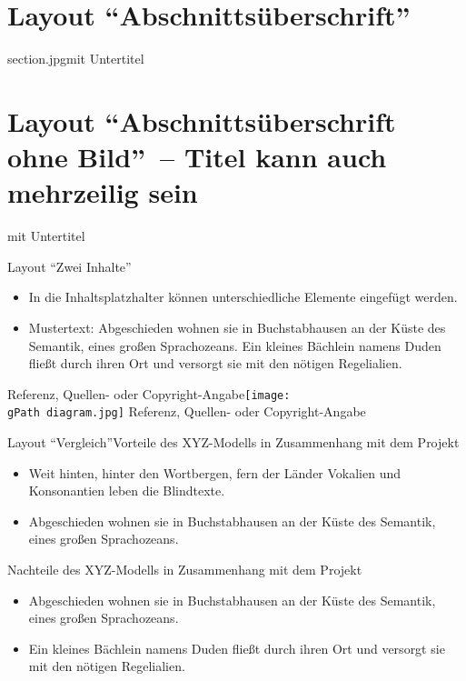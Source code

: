 \documentclass[hyperref={pdfpagelabels=false}, aspectratio=43, t]{beamer}  %
\newcommand{\gPath}{figures/}									%
\begin{document}

\section{Layout ``Abschnittsüberschrift''}

\begin{sectionFrame}{section.jpg}{mit Untertitel}
\end{sectionFrame}


\section{Layout ``Abschnittsüberschrift ohne Bild''~-- Titel kann auch mehrzeilig sein}

\begin{sectionFrame}{}{mit Untertitel}
\end{sectionFrame}


\begin{textFrame2}{Layout ``Zwei Inhalte''}{}{
		\begin{itemize}
			\item In die Inhaltsplatzhalter können unterschiedliche Elemente eingefügt werden.
			\item Mustertext: Abgeschieden wohnen sie in Buchstabhausen an der Küste des Semantik, eines großen Sprachozeans. 
					Ein kleines Bächlein namens Duden fließt durch ihren Ort und versorgt sie mit den nötigen Regelialien.
		\end{itemize}
}{Referenz, Quellen- oder Copyright-Angabe}{}{\texttt{[image: \\gPath diagram.jpg]}}%
{Referenz, Quellen- oder Copyright-Angabe}
\end{textFrame2}

\begin{textFrame2}{Layout ``Vergleich''}{Vorteile des XYZ-Modells in Zusammenhang mit dem Projekt}%
{
		\begin{itemize}
			\item Weit hinten, hinter den Wortbergen, fern der Länder Vokalien und Konsonantien leben die Blindtexte.
			\item Abgeschieden wohnen sie in Buchstabhausen an der Küste des Semantik, eines großen Sprachozeans. 
		\end{itemize}
}{}{Nachteile des XYZ-Modells in Zusammenhang mit dem Projekt}{
		\begin{itemize}
			\item Abgeschieden wohnen sie in Buchstabhausen an der Küste des Semantik, eines großen Sprachozeans.
			\item Ein kleines Bächlein namens Duden fließt durch ihren Ort und versorgt sie mit den nötigen Regelialien. 
		\end{itemize}
}{}
\end{textFrame2}
\end{document}
